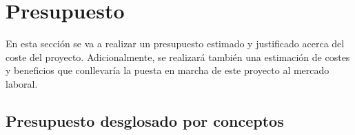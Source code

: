 


\pagestyle{miEstilo6}

\section{Presupuesto}

En esta sección se va a realizar un presupuesto estimado y justificado acerca del coste del proyecto. Adicionalmente, se realizará también una estimación de costes y beneficios que conllevaría la puesta en marcha de este proyecto al mercado laboral.

\subsection{Presupuesto desglosado por conceptos}

